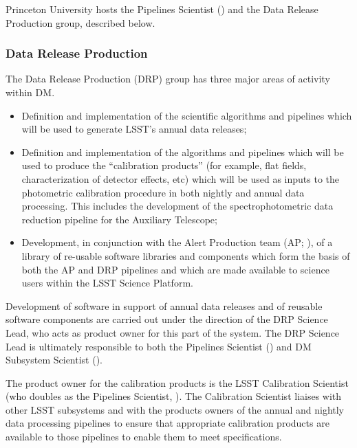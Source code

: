 Princeton University hosts the Pipelines Scientist () and the Data \gls{Release} Production group, described below.

\subsubsection{Data \gls{Release} Production \label{sect:drp}}

The Data \gls{Release} Production (\gls{DRP}) group has three major areas of activity within \gls{DM}.

\begin{itemize}

  \item{Definition and implementation of the scientific algorithms and pipelines which will be used to generate \gls{LSST}'s annual data releases;}

  \item{Definition and implementation of the algorithms and pipelines which will be used to produce the ``calibration products'' (for example, flat fields, characterization of detector effects, etc) which will be used as inputs to the photometric \gls{calibration} procedure in both nightly and annual data processing. This includes the development of the spectrophotometric data reduction \gls{pipeline} for the Auxiliary Telescope;}

  \item{Development, in conjunction with the \gls{Alert Production} team (\gls{AP}; ), of a library of re-usable software libraries and components which form the basis of both the \gls{AP} and \gls{DRP} pipelines and which are made available to science users within the \gls{LSST} \gls{Science Platform}.}

\end{itemize}

Development of software in support of annual data releases and of reusable software components are carried out under the direction of the \gls{DRP} Science Lead, who acts as product owner for this part of the system.
The \gls{DRP} Science Lead is ultimately responsible to both the Pipelines Scientist () and \gls{DM} \gls{Subsystem Scientist} ().

The product owner for the \gls{calibration} products is the \gls{LSST} \gls{Calibration Scientist} (who doubles as the Pipelines Scientist, ).
The \gls{Calibration Scientist} liaises with other \gls{LSST} subsystems and with the products owners of the annual and nightly data processing pipelines to ensure that appropriate \gls{calibration} products are available to those pipelines to enable them to meet specifications.

